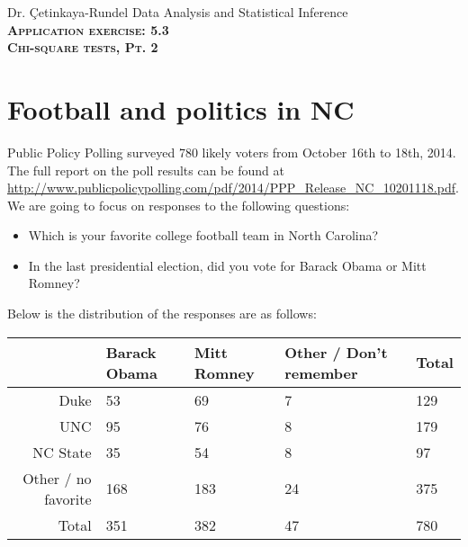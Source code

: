 \documentclass[11pt]{article}
\newcommand{\ttl}[1]{ \textsc{{\LARGE \textbf{{\color{oiB} #1} } }}}
\begin{document}
Dr. \c{C}etinkaya-Rundel \hfill Data Analysis and Statistical Inference \\

\ttl{Application exercise: 5.3 \\
Chi-square tests, Pt. 2}

\section*{Football and politics in NC}

Public Policy Polling surveyed 780 likely voters from October 16th to 18th, 2014. The full report on the poll results can be found at \url{http://www.publicpolicypolling.com/pdf/2014/PPP_Release_NC_10201118.pdf}. We are going to focus on responses to the following questions:

\begin{itemize}
\item Which is your favorite college football team in North Carolina?
\item In the last presidential election, did you vote for Barack Obama or Mitt Romney?
\end{itemize}

%
Below is the distribution of the responses are as follows:
\begin{center}
\begin{tabular}{r | l | l | l | l}
				& Barack Obama	& Mitt Romney	& Other / Don't remember	& Total \\
\hline
Duke			& 53				& 69			& 7					& 129 \\
UNC				& 95				& 76			& 8					& 179 \\
NC State			& 35				& 54			& 8					& 97 \\
Other / no favorite	& 168			& 183		& 24					& 375 \\
\hline
Total				& 351			& 382		& 47					& 780 \\
\end{tabular}
\end{center}
\end{document}
